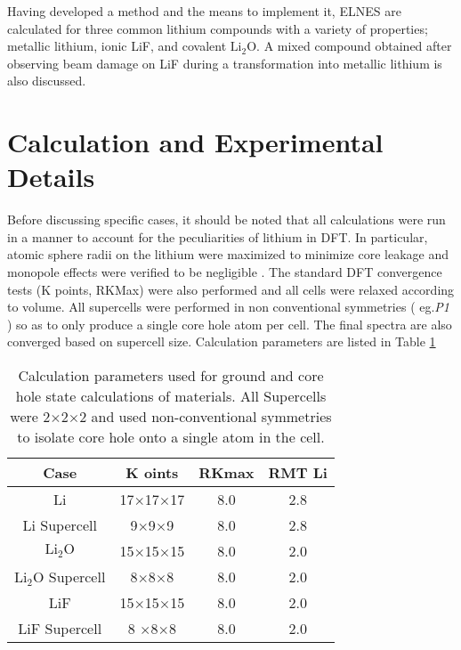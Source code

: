 
Having developed a method and the means to implement it, ELNES are calculated for three common lithium compounds with a variety of properties; metallic lithium, ionic LiF, and covalent $\mathrm{Li_2O}$.  A mixed compound obtained after observing beam damage on LiF during a transformation into metallic lithium is also discussed.


\section{Calculation and Experimental Details}
Before discussing specific cases, it should be noted that all calculations were run in a manner to account for the peculiarities of lithium in DFT. In particular, atomic sphere radii on the lithium were maximized to minimize core leakage and monopole effects were verified to be negligible \cite{mauchamp_ab_2006}.  The standard DFT convergence tests (K points, RKMax) were also performed and all cells were relaxed according to volume.  All supercells were performed in non conventional symmetries ( eg.\textit{P1} ) so as to only produce a single core hole atom per cell. The final spectra are also converged based on supercell size.   Calculation parameters are listed in Table \ref{calc_params}

\begin{table}
	\centering
	
	\begin{tabular}{cccc}
		
		Case	& K oints	& RKmax	& RMT Li				\\
		\hline
		
		Li	&17$\times$17$\times$17	&8.0	&2.8	\\
		Li Supercell	&9$\times$9$\times$9	&8.0	&2.8	\\
		$\mathrm{Li_2O}$	&15$\times$15$\times$15	&8.0	&2.0	\\
		$\mathrm{Li_2O}$ Supercell	& 8$\times$8$\times$8	&8.0	&2.0	\\
		LiF	&15$\times$15$\times$15&8.0	&2.0	\\
		LiF Supercell	&8 $\times$8$\times$8	&8.0	&2.0\\
		
	\end{tabular} 
	
	\caption{Calculation parameters used for ground and core hole state calculations of materials. All Supercells were 2$\times$2$\times$2 and used non-conventional symmetries to isolate core hole onto a single atom in the cell. }
	\label{calc_params}
\end{table}


